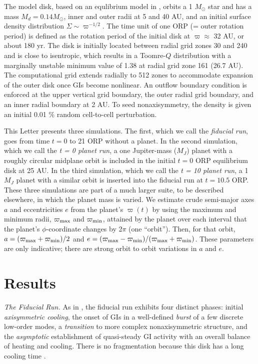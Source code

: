 \documentclass[12pt,manuscript,authoryear]{aastex}
\begin{document}
The model disk, based on an equlibrium model in \citet{pickett2003}, orbits a 1 $M_{\odot}$ star and has a mass $M_d = 0.14 M_{\odot}$, inner and outer radii at 5 and 40 AU, and an initial surface density distribution $\Sigma \sim \varpi^{-1/2}$. The time unit of one ORP (= outer rotation period) is defined as the rotation period of the initial disk at $\varpi \approx$ 32 AU, or about 180 yr. The disk is initially located between radial grid zones 30 and 240 and is close to isentropic, which results in a Toomre-$Q$ distribution with a marginally unstable \citep[see ][]{durisen2007} minimum value of 1.38 at radial grid zone 161 (26.7 AU). The computational grid extends radially to 512 zones to accommodate expansion of the outer disk once GIs become nonlinear. An outflow boundary condition is enforced at the upper vertical grid boundary, the outer radial grid boundary, and an inner radial boundary at 2 AU. To seed nonaxisymmetry, the density is given an initial 0.01 \% random cell-to-cell perturbation.

This Letter presents three simulations. The first, which we call the {\sl fiducial run}, goes from time $t = 0$ to 21 ORP without a planet. In the second simulation, which we call the {\sl t = 0 planet run}, a one Jupiter-mass ($M_J$) planet with a roughly circular midplane orbit is included in the initial $t = 0$ ORP equilibrium disk at 25 AU. In the third simulation, which we call the {\sl t = 10 planet run}, a 1 $M_J$ planet with a similar orbit is inserted into the fiducial run at $t = 10.5$ ORP. These three simulations are part of a much larger suite, to be described elsewhere, in which the planet mass is varied. We estimate crude semi-major axes $a$ and eccentricities $e$ from the planet's $\varpi(t)$ by using the maximum and minimum radii, $\varpi_{\rm max}$ and $\varpi_{\rm min}$, attained by the planet over each interval that the planet's $\phi$-coordinate changes by 2$\pi$ (one ``orbit'').  Then, for that orbit, $a = (\varpi_{\rm max}+\varpi_{\rm min})/2$ and $e = (\varpi_{\rm max}-\varpi_{\rm min})/(\varpi_{\rm max}+\varpi_{\rm min})$. These parameters are only indicative; there are strong orbit to orbit variations in $a$ and $e$.

\section{Results}

{\it The Fiducial Run.} As in \citet{mejia2005}, the fiducial run exhibits four distinct phases: initial {\sl axisymmetric cooling}, the onset of GIs in a well-defined {\sl burst} of a few discrete low-order modes, a {\sl transition} to more complex nonaxisymmetric structure, and the {\sl asymptotic} establishment of quasi-steady GI activity with an overall balance of heating and cooling. There is no fragmentation because this disk has a long cooling time \citep{gammie2001,boley2006,boley2007b}.
\end{document}
